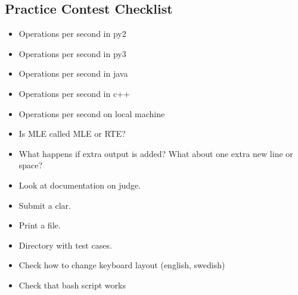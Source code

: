\documentclass[8pt,a4paper,landscape,oneside]{amsart}
\begin{document}
\begin{multicols*}{2}
\begin{large}
\section{Practice Contest Checklist}
\begin{itemize}
    \item Operations per second in py2
    \item Operations per second in py3
    \item Operations per second in java
    \item Operations per second in c++
    \item Operations per second on local machine
    \item Is MLE called MLE or RTE?
    \item What happens if extra output is added? What about one extra new line or space?
    \item Look at documentation on judge.
    \item Submit a clar.
    \item Print a file.
    \item Directory with test cases.
    \item Check how to change keyboard layout (english, swedish)
    \item Check that bash script works
\end{itemize}

\end{large}
\end{multicols*}
\end{document}
